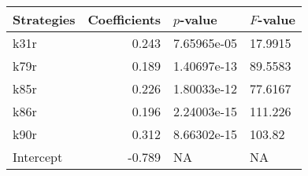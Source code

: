 \begin{tabular}{lrll}
\toprule
Strategies &  Coefficients &    $p$-value & $F$-value \\
\midrule
      k31r &         0.243 &  7.65965e-05 &   17.9915 \\
      k79r &         0.189 &  1.40697e-13 &   89.5583 \\
      k85r &         0.226 &  1.80033e-12 &   77.6167 \\
      k86r &         0.196 &  2.24003e-15 &   111.226 \\
      k90r &         0.312 &  8.66302e-15 &    103.82 \\
 Intercept &        -0.789 &           NA &        NA \\
\bottomrule
\end{tabular}
